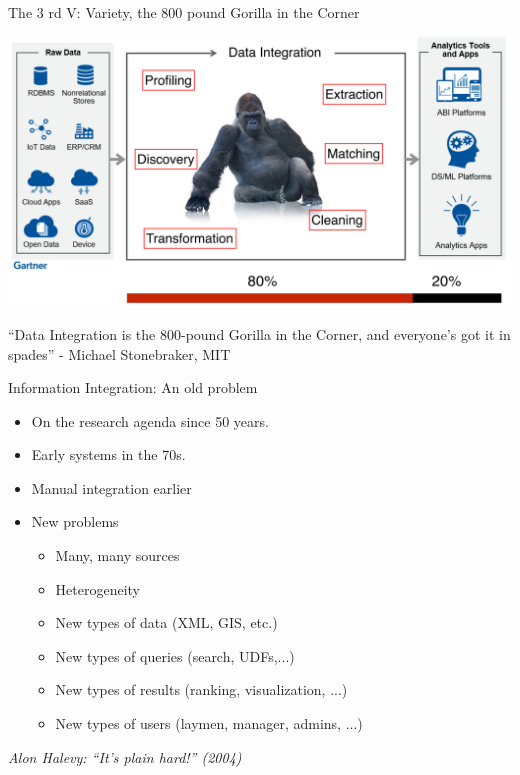 \documentclass[aspectratio=169]{../latex_main/tntbeamer}  %
\begin{document}
\begin{frame}[c]{The 3 rd V: Variety, the 800 pound Gorilla in the Corner}

    \centering
\includegraphics[width=1.0\textwidth]{bild4_gorilla}
    
     “Data Integration is the 800-pound Gorilla in the Corner, and everyone's got it in spades” - Michael Stonebraker, MIT
\end{frame}

\begin{frame}[c]{Information Integration: An old problem}
    \begin{itemize}
        \item On the research agenda since 50 years.
        \item Early systems in the 70s.
        \item Manual integration earlier
        \item New problems
        \begin{itemize}
            \item Many, many sources
            \item Heterogeneity
            \item New types of data (XML, GIS, etc.)
            \item New types of queries (search, UDFs,...)
            \item New types of results (ranking, visualization, ...) 
            \item New types of users (laymen, manager, admins, ...)
        \end{itemize}
    \end{itemize}
    \textit{Alon Halevy: “It’s plain hard!” (2004)}
\end{frame}
\end{document}
